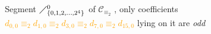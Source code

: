 
\begin{figure}[htb]

    \noindent{}

    \captionsetup{singlelinecheck=off}
    \caption[Segment $\diagup_{\lbrace 0,1,2,\ldots,2^{4}\rbrace}^{0}$ of $\mathcal{C}_{\equiv_{2}}$ ]{ 
        Segment $\diagup_{\lbrace 0,1,2,\ldots,2^{4}\rbrace}^{0}$ of $\mathcal{C}_{\equiv_{2}}$ ,
        only coefficients
        \textcolor{orange}{
            $   d_{0,0}\equiv_{2}
                d_{1,0}\equiv_{2}
                d_{3,0}\equiv_{2}
                d_{7,0}\equiv_{2}
                d_{15,0}$} 
                lying on it are \emph{odd}}

    \label{fig:catalan-first-column}

\end{figure}
